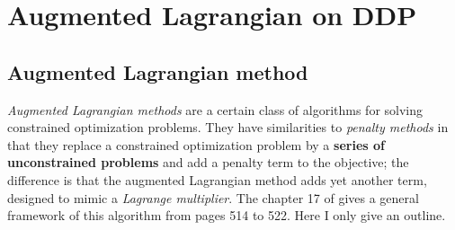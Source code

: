\documentclass{report}
\begin{document}
%
%
%
%
%
%

\chapter{Augmented Lagrangian on DDP}
\section{Augmented Lagrangian method}
\emph{Augmented Lagrangian methods} are a certain class of algorithms for solving constrained optimization problems. They have similarities to \emph{penalty methods} in that they replace a constrained optimization problem by a \textbf{series of unconstrained problems} and add a penalty term to the objective; the difference is that the augmented Lagrangian method adds yet another term, designed to mimic a \emph{Lagrange multiplier}. The chapter 17 of \cite{NoceWrig06} gives a general framework of this algorithm from pages 514 to 522. Here I only give an outline.
\end{document}
